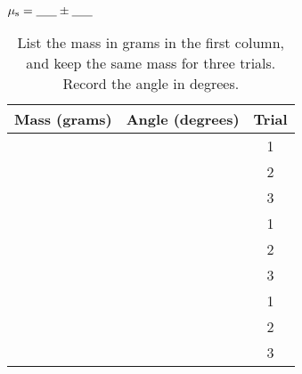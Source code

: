 \documentclass{article}
\begin{document}
$\mu_{\rm s} = \underline{~~~~~}\pm\underline{~~~~~}$

\begin{table}
\centering
\begin{tabular}{| c | c | c |}
\hline
Mass (grams) & Angle (degrees) & Trial \\ \hline
& & 1 \\ \hline
& & 2 \\ \hline
& & 3 \\ \hline
& & 1 \\ \hline
& & 2 \\ \hline
& & 3 \\ \hline
& & 1 \\ \hline
& & 2 \\ \hline
& & 3 \\ \hline
\end{tabular}
\caption{\label{tab:meas} List the mass in grams in the first column, and keep the same mass for three trials.  Record the angle in degrees.}
\end{table}
\end{document}
